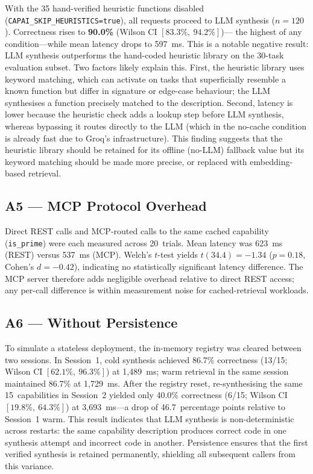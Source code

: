 \documentclass[conference]{IEEEtran}
\begin{document}
With the 35 hand-verified heuristic functions disabled
(\texttt{CAPAI\_SKIP\_HEURISTICS=true}), all requests proceed to LLM
synthesis ($n=120$).
Correctness rises to \textbf{90.0\%} (Wilson CI $[83.3\%,\ 94.2\%]$)---
the highest of any condition---while mean latency drops to 597~ms.
This is a notable negative result: LLM synthesis outperforms the
hand-coded heuristic library on the 30-task evaluation subset.
Two factors likely explain this.
First, the heuristic library uses keyword matching, which can activate
on tasks that superficially resemble a known function but differ in
signature or edge-case behaviour; the LLM synthesises a function
precisely matched to the description.
Second, latency is lower because the heuristic check adds a lookup step
before LLM synthesis, whereas bypassing it routes directly to the LLM
(which in the no-cache condition is already fast due to Groq's
infrastructure).
This finding suggests that the heuristic library should be retained
for its offline (no-LLM) fallback value but its keyword matching should
be made more precise, or replaced with embedding-based retrieval.

\subsection{A5 --- MCP Protocol Overhead}

Direct REST calls and MCP-routed calls to the same cached capability
(\texttt{is\_prime}) were each measured across 20~trials.
Mean latency was 623~ms (REST) versus 537~ms (MCP).
Welch's $t$-test yields $t(34.4)=-1.34$ ($p=0.18$, Cohen's $d=-0.42$),
indicating no statistically significant latency difference.
The MCP server therefore adds negligible overhead relative to direct REST
access; any per-call difference is within measurement noise for
cached-retrieval workloads.

\subsection{A6 --- Without Persistence}

To simulate a stateless deployment, the in-memory registry was cleared
between two sessions.
In Session~1, cold synthesis achieved 86.7\% correctness (13/15; Wilson
CI $[62.1\%,\ 96.3\%]$) at 1{,}489~ms; warm retrieval in the same
session maintained 86.7\% at 1{,}729~ms.
After the registry reset, re-synthesising the same 15~capabilities in
Session~2 yielded only 40.0\% correctness (6/15; Wilson CI
$[19.8\%,\ 64.3\%]$) at 3{,}693~ms---a drop of 46.7~percentage points
relative to Session~1 warm.
This result indicates that LLM synthesis is non-deterministic across
restarts: the same capability description produces correct code in one
synthesis attempt and incorrect code in another.
Persistence ensures that the first verified synthesis is retained
permanently, shielding all subsequent callers from this variance.
\end{document}
